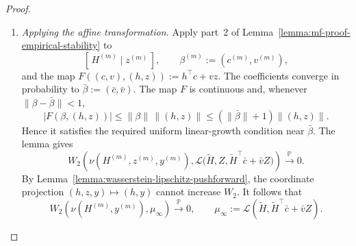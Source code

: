 \begin{proof}
\begin{enumerate}[wide]
            \item \emph{Applying the affine transformation.}
            Apply part~2 of
            Lemma~\ref{lemma:mf-proof-empirical-stability} to
            \[
                [\,H^{(m)}\mid z^{(m)}\,],
                \qquad
                \beta^{(m)}:=(c^{(m)},v^{(m)}),
            \]
            and the map
            \(
                F((c,v),(h,z)):=h^\top c+vz
            \).
            The coefficients converge in probability to
            $\bar\beta:=(\bar c,\bar v)$.
            The map $F$ is continuous and, whenever
            $\|\beta-\bar\beta\|<1$,
            \[
                |F(\beta,(h,z))|
                \leq\|\beta\|\,\|(h,z)\|
                \leq(\|\bar\beta\|+1)\|(h,z)\|.
            \]
            Hence it satisfies the required uniform linear-growth
            condition near $\bar\beta$.
            The lemma gives
            \[
                W_2\left(
                    \nu(H^{(m)},z^{(m)},y^{(m)}),
                    \mathscr L\bigl(
                        \tilde H,Z,\tilde H^\top\bar c+\bar v Z
                    \bigr)
                \right)
                \xrightarrow{\mathbb P}0.
            \]
            By Lemma~\ref{lemma:wasserstein-lipschitz-pushforward},
            the coordinate projection $(h,z,y)\mapsto(h,y)$ cannot
            increase $W_2$.
            It follows that
            \[
                W_2\left(
                    \nu(H^{(m)},y^{(m)}),
                    \mu_\infty
                \right)
                \xrightarrow{\mathbb P}0,
                \qquad
                \mu_\infty
                :=
                \mathscr L(\tilde H,\tilde H^\top\bar c+\bar v Z).
            \]
        

\end{enumerate}
\end{proof}
